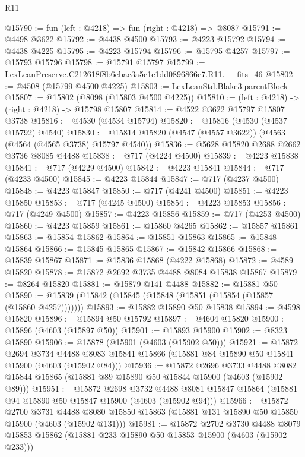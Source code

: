 \begin{lexlean}{R11}
\begin{coremodule}
@15790 := fun (left : @4218) => fun (right : @4218) => @8087
@15791 := @4498 @3622
@15792 := @4438 @4500
@15793 := @4223 @15792
@15794 := @4438 @4225
@15795 := @4223 @15794
@15796 := @15795 @4257
@15797 := @15793 @15796
@15798 := @15791 @15797
@15799 := LexLeanPreserve.C212618f8b6ebac3a5c1e1dd0896866e7.R11.__fits_46
@15802 := @4508 (@15799 @4500 @4225)
@15803 := LexLeanStd.Blake3.parentBlock
@15807 := @15802 (@8098 (@15803 @4500 @4225))
@15810 := (left : @4218) -> (right : @4218) -> @15798 @15807
@15814 := @4522 @3622 @15797 @15807 @3738
@15816 := @4530 (@4534 @15794)
@15820 := @15816 (@4530 (@4537 @15792) @4540)
@15830 := @15814 @15820 (@4547 (@4557 @3622)) (@4563 (@4564 (@4565 @3738) @15797 @4540))
@15836 := @5628 @15820 @2688 @2662 @3736 @8085 @4488
@15838 := @717 (@4224 @4500)
@15839 := @4223 @15838
@15841 := @717 (@4229 @4500)
@15842 := @4223 @15841
@15844 := @717 (@4233 @4500)
@15845 := @4223 @15844
@15847 := @717 (@4237 @4500)
@15848 := @4223 @15847
@15850 := @717 (@4241 @4500)
@15851 := @4223 @15850
@15853 := @717 (@4245 @4500)
@15854 := @4223 @15853
@15856 := @717 (@4249 @4500)
@15857 := @4223 @15856
@15859 := @717 (@4253 @4500)
@15860 := @4223 @15859
@15861 := @15860 @4265
@15862 := @15857 @15861
@15863 := @15854 @15862
@15864 := @15851 @15863
@15865 := @15848 @15864
@15866 := @15845 @15865
@15867 := @15842 @15866
@15868 := @15839 @15867
@15871 := @15836 @15868 (@4222 @15868)
@15872 := @4589 @15820
@15878 := @15872 @2692 @3735 @4488 @8084 @15838 @15867
@15879 := @8264 @15820
@15881 := @15879 @141 @4488
@15882 := @15881 @50
@15890 := @15839 (@15842 (@15845 (@15848 (@15851 (@15854 (@15857 (@15860 @4257)))))))
@15893 := @15882 @15890 @50 @15838
@15894 := @4598 @15820
@15896 := @15894 @50 @15792
@15897 := @4604 @15820
@15900 := @15896 (@4603 (@15897 @50))
@15901 := @15893 @15900
@15902 := @8323 @15890
@15906 := @15878 (@15901 (@4603 (@15902 @50)))
@15921 := @15872
    @2694
    @3734
    @4488
    @8083
    @15841
    @15866
    (@15881 @84 @15890 @50 @15841 @15900 (@4603 (@15902 @84)))
@15936 := @15872
    @2696
    @3733
    @4488
    @8082
    @15844
    @15865
    (@15881 @89 @15890 @50 @15844 @15900 (@4603 (@15902 @89)))
@15951 := @15872
    @2698
    @3732
    @4488
    @8081
    @15847
    @15864
    (@15881 @94 @15890 @50 @15847 @15900 (@4603 (@15902 @94)))
@15966 := @15872
    @2700
    @3731
    @4488
    @8080
    @15850
    @15863
    (@15881 @131 @15890 @50 @15850 @15900 (@4603 (@15902 @131)))
@15981 := @15872
    @2702
    @3730
    @4488
    @8079
    @15853
    @15862
    (@15881 @233 @15890 @50 @15853 @15900 (@4603 (@15902 @233)))

\end{coremodule}
\end{lexlean}
